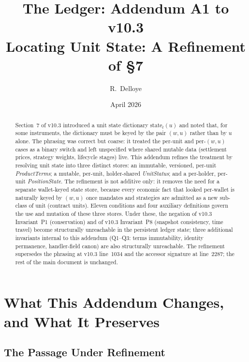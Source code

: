 \documentclass[11pt,a4paper]{article}
\title{The Ledger: Addendum A1 to v10.3\\[6pt]
\large Locating Unit State: A Refinement of \S 7}
\author{R.\ Delloye}
\date{April 2026}
\begin{document}
\maketitle

\begin{abstract}
Section~7 of v10.3 introduced a unit state dictionary $\mathrm{state}_t(u)$ and noted that, for some instruments, the dictionary must be keyed by the pair $(w, u)$ rather than by $u$ alone. The phrasing was correct but coarse: it treated the per-unit and per-$(w,u)$ cases as a binary switch and left unspecified where shared mutable data (settlement prices, strategy weights, lifecycle stages) live. This addendum refines the treatment by resolving unit state into three distinct stores: an immutable, versioned, per-unit \textit{ProductTerms}; a mutable, per-unit, holder-shared \textit{UnitStatus}; and a per-holder, per-unit \textit{PositionState}. The refinement is not additive only: it removes the need for a separate wallet-keyed state store, because every economic fact that looked per-wallet is naturally keyed by $(w, u)$ once mandates and strategies are admitted as a new sub-class of unit (contract units). Eleven conditions and four auxiliary definitions govern the use and mutation of these three stores. Under these, the negation of v10.3 Invariant~P1 (conservation) and of v10.3 Invariant~P8 (snapshot consistency, time travel) become structurally unreachable in the persistent ledger state; three additional invariants internal to this addendum (Q1--Q3: terms immutability, identity permanence, handler-field canon) are also structurally unreachable. The refinement supersedes the phrasing at v10.3 line~1034 and the accessor signature at line~2287; the rest of the main document is unchanged.
\end{abstract}

\tableofcontents
\clearpage

\section{What This Addendum Changes, and What It Preserves}
\label{sec:scope}

\subsection{The Passage Under Refinement}
\end{document}
